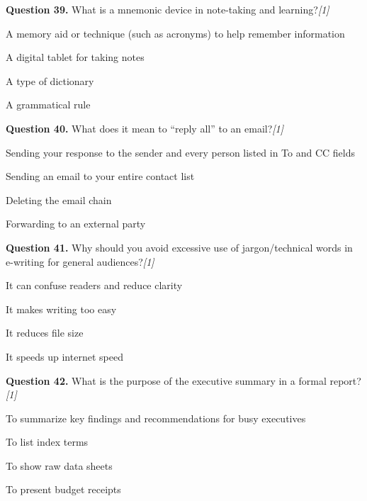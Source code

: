 \documentclass[11pt,a4paper]{article}
\newcommand{\pts}[1]{\hfill   \textit{[#1]}}
\begin{document}
\medskip




\noindent   \textbf{Question 39.} What is a mnemonic device in note-taking and learning?\pts{1}

\begin{parts}
  \item A memory aid or technique (such as acronyms) to help remember information
  \item A digital tablet for taking notes
  \item A type of dictionary
  \item A grammatical rule
\end{parts}

\medskip




\noindent   \textbf{Question 40.} What does it mean to ``reply all'' to an email?\pts{1}

\begin{parts}
  \item Sending your response to the sender and every person listed in To and CC fields
  \item Sending an email to your entire contact list
  \item Deleting the email chain
  \item Forwarding to an external party
\end{parts}

\medskip




\noindent   \textbf{Question 41.} Why should you avoid excessive use of jargon/technical words in e-writing for general audiences?\pts{1}

\begin{parts}
  \item It can confuse readers and reduce clarity
  \item It makes writing too easy
  \item It reduces file size
  \item It speeds up internet speed
\end{parts}

\medskip




\noindent   \textbf{Question 42.} What is the purpose of the executive summary in a formal report?\pts{1}

\begin{parts}
  \item To summarize key findings and recommendations for busy executives
  \item To list index terms
  \item To show raw data sheets
  \item To present budget receipts
\end{parts}
\end{document}
